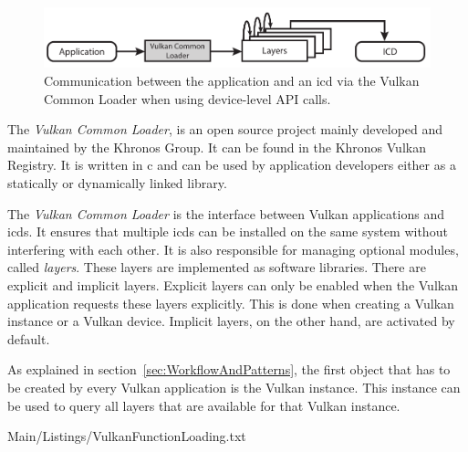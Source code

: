     \begin{figure}
      \includegraphics{Main/Images/VulkanLoaderDeviceLayers}
      \centering
      \caption{Communication between the application and an \gls{icd} via the Vulkan Common Loader when using device-level API calls.}
      \label{fig:VulkanLoaderWithDeviceLayers}
    \end{figure}

    The \textit{Vulkan Common Loader}, is an open source project mainly developed and maintained by the Khronos Group. It can be found in the Khronos Vulkan Registry\cite{vulkanregistry}. It is written in \gls{c} and can be used by application developers either as a statically or dynamically linked library.

    The \textit{Vulkan Common Loader} is the interface between Vulkan applications and \glspl{icd}. It ensures that multiple \glspl{icd} can be installed on the same system without interfering with each other. It is also responsible for managing optional modules, called \textit{layers}. These layers are implemented as software libraries. There are explicit and implicit layers. Explicit layers can only be enabled when the Vulkan application requests these layers explicitly. This is done when creating a Vulkan instance or a Vulkan device. Implicit layers, on the other hand, are activated by default.




    As explained in section~\ref{sec:WorkflowAndPatterns}, the first object that has to be created by every Vulkan application is the Vulkan instance. This instance can be used to query all layers that are available for that Vulkan instance.

    
    {Main/Listings/VulkanFunctionLoading.txt}

